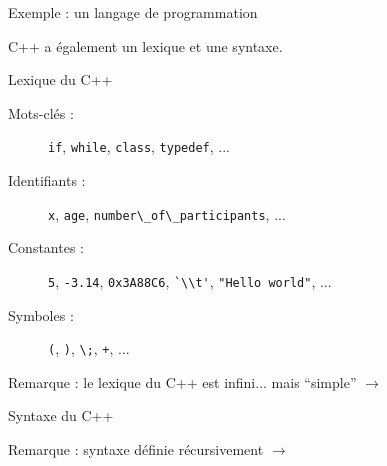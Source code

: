 
\begingroup

\begin{frame}{Exemple : un langage de programmation}

  C++ a également un lexique et une syntaxe.
  \begin{block}{Lexique du C++}
    \begin{description}
    \item[Mots-clés :] \lstinline{if}, \lstinline{while}, \lstinline{class}, \lstinline{typedef}, ...
    \item[Identifiants :] \lstinline{x}, \lstinline{age}, \lstinline{number\_of\_participants}, ...
    \item[Constantes :] \lstinline{5}, \lstinline{-3.14}, \lstinline{0x3A88C6}, \lstinline{`\\t'}, \lstinline{"Hello world"}, ...
    \item[Symboles :] \lstinline{(}, \lstinline{)}, \lstinline{\;}, \lstinline{+}, ...
    \end{description}
    \alert{Remarque :} le lexique du C++ est infini... mais ``simple'' $\rightarrow$ 
  \end{block}
  
  \begin{block}{Syntaxe du C++}
    \alert{Remarque :} syntaxe définie récursivement $\rightarrow$ 
  \end{block}

\end{frame}

\endgroup
\endinput
